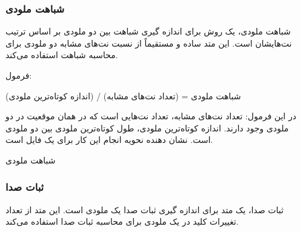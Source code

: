 \subsubsection{ شباهت ملودی }

شباهت ملودی، یک روش برای اندازه گیری شباهت بین دو ملودی بر اساس ترتیب نت‌هایشان است. این متد ساده و مستقیماً از نسبت نت‌های مشابه دو ملودی برای محاسبه شباهت استفاده می‌کند.

فرمول:

شباهت ملودی = (تعداد نت‌های مشابه) / (اندازه کوتاه‌ترین ملودی)

در این فرمول:
تعداد نت‌های مشابه، تعداد نت‌هایی است که در همان موقعیت در دو ملودی وجود دارند.
اندازه کوتاه‌ترین ملودی، طول کوتاه‌ترین ملودی بین دو ملودی است.
 نشان دهنده نحویه انجام این کار برای یک فایل  است. 

\begin{LTR}
      \begin{algorithm}
            \caption{شباهت ملودی }
            \setmainfont{Times New Roman}
            \label{alg:analyze_melodic_similarity}
            \begin{algorithmic}
            \end{algorithmic}
      \end{algorithm}
\end{LTR}
\subsubsection{ ثبات صدا }

ثبات صدا، یک متد برای اندازه گیری ثبات صدا یک ملودی است. این متد از تعداد تغییرات کلید در یک ملودی برای محاسبه ثبات صدا استفاده می‌کند.

